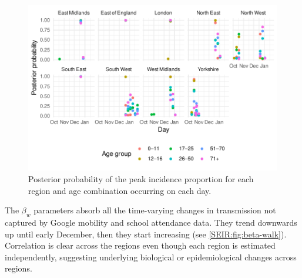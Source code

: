 \documentclass[thesis.tex]{subfiles}
\begin{document}
\begin{figure}
    \includegraphics{SEIR/CIS/p_peak}
    \caption[Posterior estimates of peak incidence timing]{%
        Posterior probability of the peak incidence proportion for each region and age combination occurring on each day.
    }
    \label{SEIR:fig:peak-incidence}
\end{figure}

The $\beta_w$ parameters absorb all the time-varying changes in transmission not captured by Google mobility and school attendance data.
They trend downwards up until early December, then they start increasing (see \cref{SEIR:fig:beta-walk}).
Correlation is clear across the regions even though each region is estimated independently, suggesting underlying biological or epidemiological changes across regions.
\end{document}
